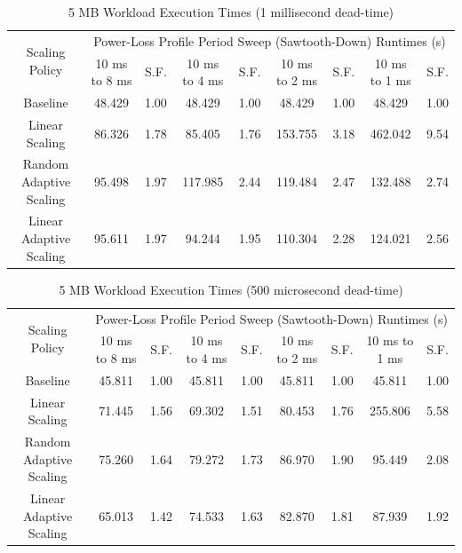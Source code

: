 \documentclass[journal, twoside]{IEEEtran}
\begin{document}
\begin{table}
    \renewcommand{\arraystretch}{1.3} %
    \caption{5 MB Workload Execution Times (1 millisecond dead-time)}
    \label{main-workload-results-1ms}
    \centering
    \begin{tabular}{c||c|c|c|c|c|c|c|c}
        \hline
        \multirow{2}{*}{Scaling Policy} & \multicolumn{8}{c}{Power-Loss Profile Period Sweep (Sawtooth-Down) Runtimes (s)} \\\cline{2-9}
        {} & {10 ms to 8 ms} & {S.F.} & {10 ms to 4 ms} & {S.F.} & {10 ms to 2 ms} & {S.F.} & {10 ms to 1 ms} & {S.F.} \\
        \hline
        \hline
        {Baseline}                  & {48.429} & {1.00} & {48.429}  & {1.00} & {48.429}  & {1.00} & {48.429}  & {1.00}\\
        {Linear Scaling}            & {86.326} & {1.78} & {85.405}  & {1.76} & {153.755} & {3.18} & {462.042} & {9.54}\\
        {Random Adaptive Scaling}   & {95.498} & {1.97} & {117.985} & {2.44} & {119.484} & {2.47} & {132.488} & {2.74}\\
        {Linear Adaptive Scaling}   & {95.611} & {1.97} & {94.244}  & {1.95} & {110.304} & {2.28} & {124.021} & {2.56}\\
        \hline
    \end{tabular}
\end{table}

\begin{table}
    \renewcommand{\arraystretch}{1.3} %
    \caption{5 MB Workload Execution Times (500 microsecond dead-time)}
    \label{main-workload-results-500us}
    \centering
    \begin{tabular}{c||c|c|c|c|c|c|c|c}
        \hline
        \multirow{2}{*}{Scaling Policy} & \multicolumn{8}{c}{Power-Loss Profile Period Sweep (Sawtooth-Down) Runtimes (s)} \\\cline{2-9}
        {} & {10 ms to 8 ms} & {S.F.} & {10 ms to 4 ms} & {S.F.} & {10 ms to 2 ms} & {S.F.} & {10 ms to 1 ms} & {S.F.} \\
        \hline
        \hline
        {Baseline}                  & {45.811} & {1.00} & {45.811}  & {1.00} & {45.811} & {1.00}  & {45.811}  & {1.00}\\
        {Linear Scaling}            & {71.445} & {1.56} & {69.302}  & {1.51} & {80.453} & {1.76}  & {255.806} & {5.58}\\
        {Random Adaptive Scaling}   & {75.260} & {1.64} & {79.272}  & {1.73} & {86.970} & {1.90}  & {95.449}  & {2.08}\\
        {Linear Adaptive Scaling}   & {65.013} & {1.42} & {74.533}  & {1.63} & {82.870} & {1.81}  & {87.939}  & {1.92}\\
        \hline
    \end{tabular}
\end{table}
\end{document}
